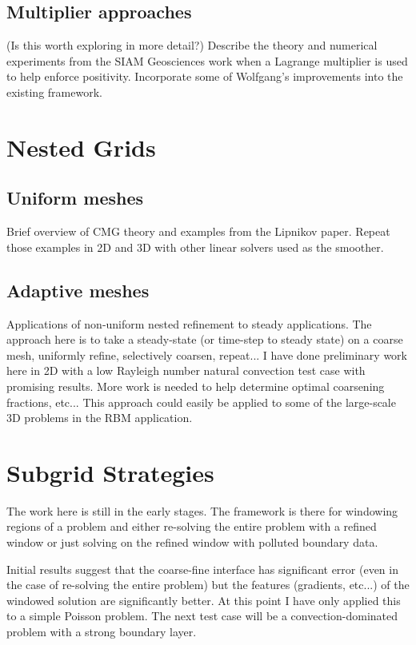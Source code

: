 \documentclass[12pt,pdftex]{article}
\begin{document}
\begin{spacing}{1.5}
\subsection{Multiplier approaches}
(Is this worth exploring in more detail?) Describe the theory and
numerical experiments from the SIAM Geosciences work when a Lagrange
multiplier is used to help enforce positivity.  Incorporate some of
Wolfgang's improvements into the existing framework.

\section{Nested Grids}
\subsection{Uniform meshes}
Brief overview of CMG theory and examples from the Lipnikov paper.
Repeat those examples in 2D and 3D with other linear solvers used as
the smoother.

\subsection{Adaptive meshes}
Applications of non-uniform nested refinement to steady applications.
The approach here is to take a steady-state (or time-step to steady
state) on a coarse mesh, uniformly refine, selectively coarsen,
repeat...  I have done preliminary work here in 2D with a low Rayleigh
number natural convection test case with promising results.  More work
is needed to help determine optimal coarsening fractions, etc...  This
approach could easily be applied to some of the large-scale 3D
problems in the RBM application.


\section{Subgrid Strategies}
The work here is still in the early stages.  The framework is there
for windowing regions of a problem and either re-solving the entire
problem with a refined window or just solving on the refined window
with polluted boundary data.

Initial results suggest that the coarse-fine interface has significant
error (even in the case of re-solving the entire problem) but the
features (gradients, etc...) of the windowed solution are
significantly better.  At this point I have only applied this to a
simple Poisson problem.  The next test case will be a
convection-dominated problem with a strong boundary layer.


\end{spacing}
\end{document}
